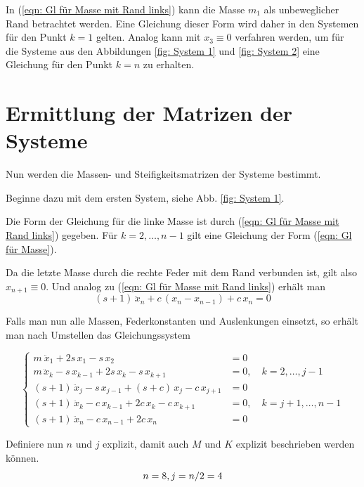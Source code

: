 \documentclass[a4paper,12pt]{report}
\newcommand{\1}{\mathds{1}}
\theoremstyle{plain} %
\theoremstyle{definition} %
\theoremstyle{remark}
\begin{document}
            In (\ref{eqn: Gl für Masse mit Rand links}) kann die Masse $m_1$ als unbeweglicher Rand betrachtet werden.
            Eine Gleichung dieser Form wird daher in den Systemen für den Punkt $k=1$ gelten.
            Analog kann mit $x_3\equiv 0$ verfahren werden, um für die Systeme aus den Abbildungen \ref{fig: System 1} und \ref{fig: System 2} eine Gleichung für den Punkt $k=n$ zu erhalten.

      \section{Ermittlung der Matrizen der Systeme}
            Nun werden die Massen- und Steifigkeitsmatrizen der Systeme bestimmt.
           
            Beginne dazu mit dem ersten System, siehe Abb. \ref{fig: System 1}.

            Die Form der Gleichung für die linke Masse ist durch (\ref{eqn: Gl für Masse mit Rand links}) gegeben.
            Für $k=2,\dots, n-1$ gilt eine Gleichung der Form (\ref{eqn: Gl für Masse}).
            
            Da die letzte Masse durch die rechte Feder mit dem Rand verbunden ist, gilt also $x_{n+1} \equiv 0$.
            Und analog zu (\ref{eqn: Gl für Masse mit Rand links}) erhält man
            $$(s+1)\,\ddot x_n + c\,(x_n-x_{n-1}) + c\,x_n = 0$$  

            Falls man nun alle Massen, Federkonstanten und Auslenkungen einsetzt, so erhält man nach Umstellen das Gleichungssystem

            $$\begin{cases}
                  m\ \ddot x_1 + 2s\,x_1 - s\,x_2 & = 0   \\
                  m\,\ddot x_k -s\,x_{k-1} + 2s\,x_k -s\,x_{k+1} & = 0,\quad k=2,\dots,j-1\\
                  (s+1)\,\ddot x_j -s\,x_{j-1} + (s+c)\,x_j -c\,x_{j+1} & = 0\\
                  (s+1)\,\ddot x_k -c\,x_{k-1} + 2c\,x_k -c\,x_{k+1} & = 0,\quad k=j+1,\dots,n-1\\
                  (s+1)\,\ddot x_n -c\,x_{n-1}+ 2c\,x_n & = 0
            \end{cases}$$


            Definiere nun $n$ und $j$ explizit, damit auch $M$ und $K$ explizit beschrieben werden können.
            \begin{equation}
                  \label{def: nUndJ explizit}
                  n=8,\\
                  j=n/2=4
            \end{equation}
\end{document}
